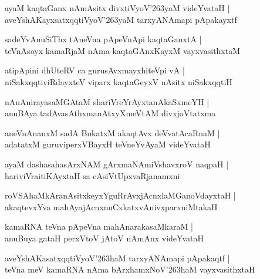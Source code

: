 \documentclass[twoside,12pt,openright]{book}
\def\S{\char'263}
\newcounter{shloka}[chapter]
\begin{document}
\begin{shloka}%
ayaM kaqtaGanx nAmAsitx divxtiVyoV\S yaM videYvataH |\\
aveYshAKayxsatxqqtiVyoV\S yaM  tarxyANAmapi pApakayxtf 
\end{shloka}

\begin{shloka}%
sadeYvAnuSiThx tAneVna pApeVnApi kaqtaGanxtA |\\
teVnAsayx kamaRjaM nAma kaqtaGAnxKayxM vayxvasithxtaM 
\end{shloka}

\begin{shloka}%
atipApini dhUteRV ca gurusAvxmayxhiteVpi vA |\\
niSakxqqtiviRdayxteV viparx kaqtaGeyxV nAsitx niSakxqqtiH
\end{shloka}

\begin{shloka}%
nAnAnirayasaMGAtaM shariVreYrAyxtanAkaSxmeYH |\\
anuBAya tadAvasAthxmanAtxyXmeVtAM divxjoVtatxma
\end{shloka}

\begin{shloka}%
aneVnAnanxM sadA BukatxM akaqtAvx deVvatAcaRnaM |\\
adatatxM guruviperxVBayxH teVneYvAyaM videYvataH 
\end{shloka}

\begin{shloka}%
ayaM dashasahasArxNAM gArxmaNAmiVshavxroV naqpaH |\\
hariviVraitiKAyxtaH sa cAsiVtUpxvaRjanamxni
\end{shloka}

\begin{shloka}%
roVSAhaMkAranAsitxkeyxYguRrAvxjAcnxlaMGanoVdayxtaH |\\
akaqtevxYva mahAyajAcnxnuCxkatxvAnivxparxniMtakaH 
\end{shloka}

\begin{shloka}%
kamaRNA teVna pApeVna mahAnarakasaMkaraM |\\
anuBuya gataH perxVtoV jAtoV nAmAnx videYvataH 
\end{shloka}

\begin{shloka}%
aveYshAKasatxqqtiVyoV\S haM tarxyANAmapi pApakaqtf |\\
teVna meV kamaRNA nAma bArxhamxNoV\S haM vayxvasithxtaH 
\end{shloka}
\end{document}
